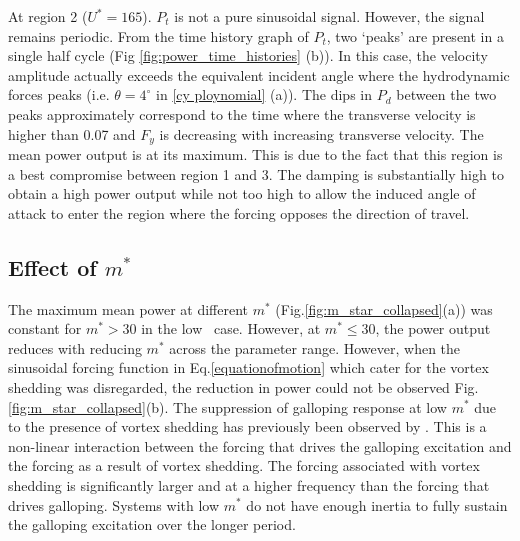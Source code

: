 At region 2 ($U^*=165$). $P_t$ is not a pure sinusoidal signal. However, the  signal remains periodic. From the time history graph of $P_t$, two `peaks' are present in a single half cycle (Fig \ref{fig:power_time_histories} (b)). In this case, the velocity amplitude actually exceeds the equivalent incident angle where the hydrodynamic forces peaks (i.e. $\theta=4^\circ$ in \ref{cy ploynomial} (a)). The dips in $P_d$ between the two peaks approximately correspond to the time where the transverse velocity is higher than 0.07 and $F_y$ is decreasing with increasing transverse velocity. The mean power output is at its maximum. This is due to the fact that this region is a best compromise between region 1 and 3. The damping is substantially high to obtain a high power output while not too high to allow the induced angle of attack to enter the region where the forcing opposes the direction of travel. 


 
  



\subsection{Effect of $m^*$}

 
 

The maximum mean power at different $m^*$ (Fig.\ref{fig:m_star_collapsed}(a)) was constant for $m^*>30$ in the low \reynoldsnumber\ case. However, at $m^* \leq 30$, the power output reduces with reducing $m^*$ across the parameter range. However, when the sinusoidal forcing function in Eq.\ref{equationofmotion} which cater for the vortex shedding was disregarded, the reduction in power could not be observed Fig.\ref{fig:m_star_collapsed}(b). The suppression of galloping response at low $m^*$ due to the presence of vortex shedding has previously been observed by \cite{Joly2012}. This is a non-linear interaction between the forcing that drives the galloping excitation and the forcing as a result of vortex shedding. The forcing associated with vortex  shedding is significantly larger and at a higher frequency than the forcing that drives galloping. Systems with low $m^*$ do not have enough inertia to fully sustain the galloping excitation over the longer period.

